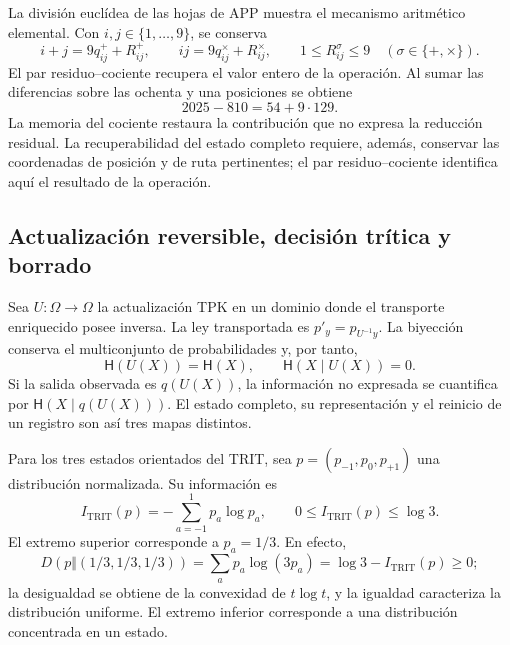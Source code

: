 La división euclídea de las hojas de APP muestra el mecanismo
aritmético elemental. Con \(i,j\in\{1,\ldots,9\}\), se conserva
\[
 i+j=9q^+_{ij}+R^+_{ij},\qquad
 ij=9q^\times_{ij}+R^\times_{ij},\qquad
 1\leq R^\sigma_{ij}\leq9\quad(\sigma\in\{+,\times\}).
\]
El par residuo--cociente recupera el valor entero de la operación.
Al sumar las diferencias sobre las ochenta y una posiciones se obtiene
\[
 2025-810=54+9\cdot129.
\]
La memoria del cociente restaura la contribución que no expresa la
reducción residual. La recuperabilidad del estado completo requiere,
además, conservar las coordenadas de posición y de ruta pertinentes;
el par residuo--cociente identifica aquí el resultado de la operación.

\subsection{Actualización reversible, decisión trítica y borrado}

Sea \(U:\Omega\to\Omega\) la actualización TPK en un dominio donde
el transporte enriquecido posee inversa. La ley transportada es
\(p'_y=p_{U^{-1}y}\). La biyección conserva el multiconjunto de
probabilidades y, por tanto,
\begin{equation}
 \mathsf H(U(X))=\mathsf H(X),\qquad
 \mathsf H(X\mid U(X))=0.
 \label{eq:ii-kb-aut-reversible}
\end{equation}
Si la salida observada es \(q(U(X))\), la información no expresada
se cuantifica por \(\mathsf H(X\mid q(U(X)))\). El estado completo,
su representación y el reinicio de un registro son así tres mapas distintos.

Para los tres estados orientados del TRIT, sea
\(p=(p_{-1},p_0,p_{+1})\) una distribución normalizada. Su información es
\begin{equation}
 I_{\mathrm{TRIT}}(p)=-\sum_{a=-1}^{1}p_a\log p_a,
 \qquad 0\leq I_{\mathrm{TRIT}}(p)\leq\log3.
 \label{eq:ii-kb-aut-trit}
\end{equation}
El extremo superior corresponde a \(p_a=1/3\). En efecto,
\[
 D(p\Vert(1/3,1/3,1/3))
 =\sum_ap_a\log(3p_a)=\log3-I_{\mathrm{TRIT}}(p)\geq0;
\]
la desigualdad se obtiene de la convexidad de \(t\log t\), y la
igualdad caracteriza la distribución uniforme. El extremo inferior
corresponde a una distribución concentrada en un estado.

